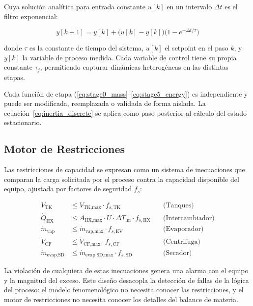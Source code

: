 \documentclass[10pt,letterpaper,twocolumn]{article}
\begin{document}
Cuya soluci\'on anal\'itica para entrada constante $u[k]$ en un intervalo $\Delta t$ es el filtro exponencial:

\begin{equation}
y[k+1] = y[k] + \bigl( u[k] - y[k] \bigr) \bigl( 1 - e^{-\Delta t / \tau} \bigr) \label{eq:inertia_discrete}
\end{equation}

donde $\tau$ es la constante de tiempo del sistema, $u[k]$ el setpoint en el paso $k$, y $y[k]$ la variable de proceso medida. Cada variable de control tiene su propia constante $\tau_j$, permitiendo capturar din\'amicas heterog\'eneas en las distintas etapas.

Cada funci\'on de etapa (\eqref{eq:stage0_mass}--\eqref{eq:stage5_energy}) es independiente y puede ser modificada, reemplazada o validada de forma aislada. La ecuaci\'on~\eqref{eq:inertia_discrete} se aplica como paso posterior al c\'alculo del estado estacionario.

\subsection{Motor de Restricciones}

Las restricciones de capacidad se expresan como un sistema de inecuaciones que comparan la carga solicitada por el proceso contra la capacidad disponible del equipo, ajustada por factores de seguridad $f_s$:

\begin{align}
V_{\text{TK}} &\leq V_{\text{TK,max}} \cdot f_{s,\text{TK}} \quad &\text{(Tanques)} \label{eq:constr_tank} \\
\dot{Q}_{\text{HX}} &\leq A_{\text{HX,max}} \cdot U \cdot \Delta T_{\text{lm}} \cdot f_{s,\text{HX}} \quad &\text{(Intercambiador)} \label{eq:constr_hx} \\
\dot{m}_{\text{vap}} &\leq \dot{m}_{\text{vap,max}} \cdot f_{s,\text{EV}} \quad &\text{(Evaporador)} \label{eq:constr_evap} \\
\dot{V}_{\text{CF}} &\leq \dot{V}_{\text{CF,max}} \cdot f_{s,\text{CF}} \quad &\text{(Centrifuga)} \label{eq:constr_cf} \\
\dot{m}_{\text{evap,SD}} &\leq \dot{m}_{\text{evap,SD,max}} \cdot f_{s,\text{SD}} \quad &\text{(Secador)} \label{eq:constr_sd}
\end{align}

La violaci\'on de cualquiera de estas inecuaciones genera una alarma con el equipo y la magnitud del exceso. Este dise\~no desacopla la detecci\'on de fallas de la l\'ogica del proceso: el modelo fenomenol\'ogico no necesita conocer las restricciones, y el motor de restricciones no necesita conocer los detalles del balance de materia.
\end{document}
